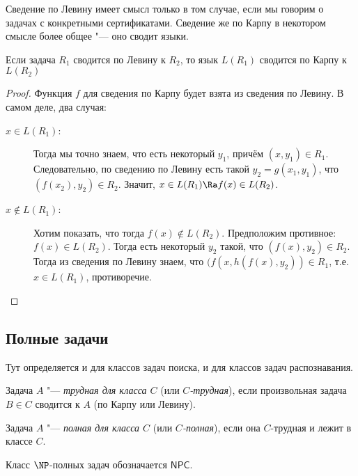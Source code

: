 	\begin{Rem}
		Сведение по Левину имеет смысл только в том случае, если мы говорим о задачах с конкретными сертификатами.
		Сведение же по Карпу в некотором смысле более общее "--- оно сводит языки.
	\end{Rem}
	\begin{assertion}
		Если задача $R_1$ сводится по Левину к $R_2$, то язык $L(R_1)$ сводится по Карпу к $L(R_2)$
	\end{assertion}
	\begin{proof}
		Функция $f$ для сведения по Карпу будет взята из сведения по Левину.
		В самом деле, два случая:
		\begin{description}
			\item[$x \in L(R_1)$:]
				Тогда мы точно знаем, что есть некоторый $y_1$, причём $(x, y_1) \in R_1$.
				Следовательно, по сведению по Левину есть такой $y_2=g(x_1, y_1)$, что $(f(x_2), y_2) \in R_2$.
				Значит, $x \in L(R_1) \Ra f(x) \in L(R_2)$.
			\item[$x \notin L(R_1)$:]
				Хотим показать, что тогда $f(x) \notin L(R_2)$.
				Предположим противное: $f(x) \in L(R_2)$.
				Тогда есть некоторый $y_2$ такой, что $(f(x), y_2) \in R_2$.
				Тогда из сведения по Левину знаем, что $(f(x, h(f(x), y_2)) \in R_1$, т.е. $x \in L(R_1)$,
				противоречие.
		\end{description}
	\end{proof}

\subsection{Полные задачи}
	Тут определяется и для классов задач поиска, и для классов задач распознавания.

	\begin{Def}
		Задача $A$ "--- \textit{трудная для класса $C$} (или \textit{$C$-трудная}), если произвольная задача $B \in C$ сводится к $A$ (по Карпу или Левину).
	\end{Def}
	\begin{Def}
		Задача $A$ "--- \textit{полная для класса $C$} (или \textit{$C$-полная}), если она $C$-трудная и лежит в классе $C$.
	\end{Def}

	\begin{Def}
		Класс $\NP$-полных задач обозначается $\mathsf{NPC}$.
	\end{Def}

